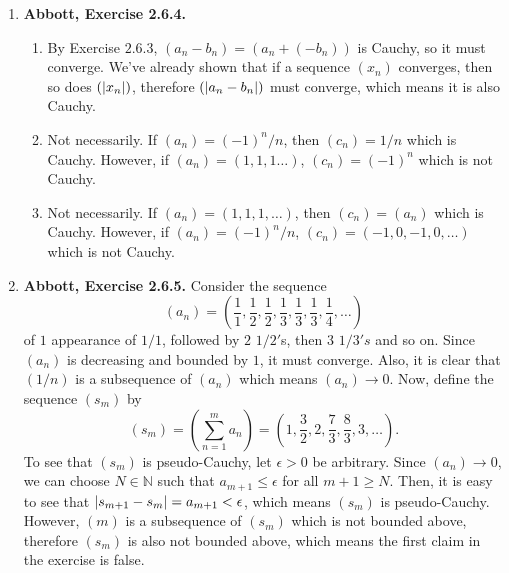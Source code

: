 \documentclass{article}
\DeclarePairedDelimiter\abs{\lvert}{\rvert}
\newcommand{\N}{\mathbb{N}}
\newcommand{\R}{\mathbb{R}}
\newcommand{\ra}{\rightarrow}
\newcommand{\exc}[2][Abbott]{\item \textbf{#1, Exercise #2.}}
\newcommand{\lep}[1][L]{#1et $\epsilon > 0$ be arbitrary}
\begin{document}
\begin{enumerate}
\begin{enumerate}
        \item \lep. Since both sequences are Cauchy, we can pick some positive $M_1, M_2 \in \R$ such that $\abs{x_n} \leq M_1$ and $\abs{y_n} \leq M_2$ for all $n \in \N$. Choose $N \in \N$ such that $\abs{x_n-x_m} < \epsilon/(2M_2)$ and $\abs{y_n-y_m} < \epsilon/(2M_1)$ for all $n, m \geq N$. Then,
        \begin{align*}
            \abs{x_n y_n - x_m y_m} &= \abs{x_n y_n - x_n y_m + x_n y_m - x_m y_m} \\
            &\leq \abs{x_n} \abs{y_n - y_m} + \abs{y_m} \abs{x_n - x_m} \\ &\leq M_1 \abs{y_n-y_m} + M_2 \abs{x_n - x_m} < \epsilon
        \end{align*} for all $n,m \geq N$, so $(x_n y_n)$ is Cauchy.
    \end{enumerate}
    
    \exc{2.6.4}
    \begin{enumerate}
        \item By Exercise $2.6.3$, $(a_n - b_n) = (a_n + (-b_n))$ is Cauchy, so it must converge. We've already shown that if a sequence $(x_n)$ converges, then so does $(\abs{x_n})$, therefore $(\abs{a_n-b_n})$ must converge, which means it is also Cauchy.
        
        \item Not necessarily. If $(a_n) = (-1)^n/n$, then $(c_n) = 1/n$ which is Cauchy. However, if $(a_n) = (1,1,1\dots)$, $(c_n) = (-1)^n$ which is not Cauchy.
        
        \item Not necessarily. If $(a_n) = (1,1,1,\dots)$, then $(c_n) = (a_n)$ which is Cauchy. However, if $(a_n) = (-1)^n/n$, $(c_n) = (-1, 0,-1, 0, \dots)$ which is not Cauchy.
    \end{enumerate}
    
    \exc{2.6.5}
    Consider the sequence 
    \begin{equation*}
        (a_n) = (\frac{1}{1}, \frac{1}{2}, \frac{1}{2}, \frac{1}{3}, \frac{1}{3}, \frac{1}{3}, \frac{1}{4}, \dots)
    \end{equation*} of $1$ appearance of $1/1$, followed by $2$ $1/2'$s, then $3$ $1/3's$ and so on. Since $(a_n)$ is decreasing and bounded by $1$, it must converge. Also, it is clear that $(1/n)$ is a subsequence of $(a_n)$ which means $(a_n) \ra 0$. Now, define the sequence $(s_m)$ by
    \begin{equation*}
        (s_m) = (\sum_{n=1}^m a_n) = (1, \frac{3}{2}, 2, \frac{7}{3}, \frac{8}{3}, 3, \dots).
    \end{equation*} To see that $(s_m)$ is pseudo-Cauchy, \lep[l]. Since $(a_n) \ra 0$, we can choose $N \in \N$ such that $a_{m+1} \leq \epsilon$ for all $m+1 \geq N$. Then, it is easy to see that $\abs{s_{m+1}-s_m} = a_{m+1} < \epsilon$, which means $(s_m)$ is pseudo-Cauchy. However, $(m)$ is a subsequence of $(s_m)$ which is not bounded above, therefore $(s_m)$ is also not bounded above, which means the first claim in the exercise is false.
    

\end{enumerate}
\end{document}
